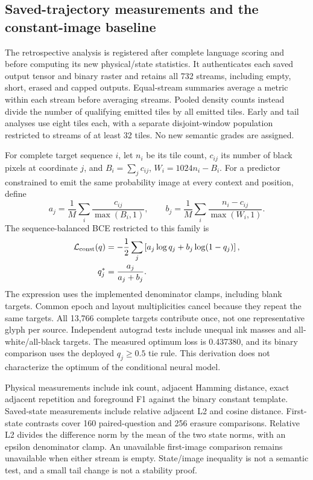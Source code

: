 \subsection*{Saved-trajectory measurements and the constant-image baseline}
The retrospective analysis is registered after complete language scoring and
before computing its new physical/state statistics. It authenticates each
saved output tensor and binary raster and retains all 732 streams, including
empty, short, erased and capped outputs. Equal-stream summaries average a
metric within each stream before averaging streams. Pooled density counts
instead divide the number of qualifying emitted tiles by all emitted tiles.
Early and tail analyses use eight tiles each, with a separate disjoint-window
population restricted to streams of at least 32 tiles. No new semantic grades
are assigned.

For complete target sequence $i$, let $n_i$ be its tile count, $c_{ij}$ its
number of black pixels at coordinate $j$, and $B_i=\sum_j c_{ij}$,
$W_i=1024n_i-B_i$. For a predictor constrained to emit the same probability
image at every context and position, define
\begin{equation}
 a_j=\frac1M\sum_i\frac{c_{ij}}{\max(B_i,1)},\qquad
 b_j=\frac1M\sum_i\frac{n_i-c_{ij}}{\max(W_i,1)}.
 \label{eq:constant-writing-weights}
\end{equation}
The sequence-balanced BCE restricted to this family is
\begin{equation}
 \begin{aligned}
 \mathcal L_{\rm const}(q)&=-\frac12\sum_j
 \left[a_j\log q_j+b_j\log(1-q_j)\right],\\
 q_j^*&=\frac{a_j}{a_j+b_j}.
 \end{aligned}
 \label{eq:constant-writing-optimum}
\end{equation}
The expression uses the implemented denominator clamps, including blank targets.
Common epoch and layout multiplicities cancel because they repeat the same
targets. All 13,766 complete targets contribute once, not one representative
glyph per source. Independent autograd tests include unequal ink masses and
all-white/all-black targets. The measured optimum loss is 0.437380, and its
binary comparison uses the deployed $q_j\geq0.5$ tie rule. This derivation
does not characterize the optimum of the conditional neural model.

Physical measurements include ink count, adjacent Hamming distance, exact
adjacent repetition and foreground F1 against the binary constant template.
Saved-state measurements include relative adjacent L2 and cosine distance.
First-state contrasts cover 160 paired-question and 256 erasure comparisons.
Relative L2 divides the difference norm by the mean of the two state norms,
with an epsilon denominator clamp. An unavailable first-image comparison
remains unavailable when either stream is empty. State/image inequality is
not a semantic test, and a small tail change is not a stability proof.

